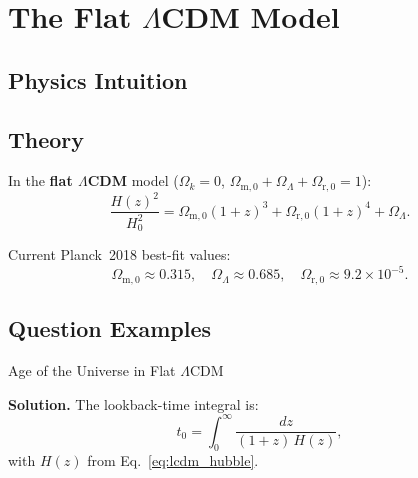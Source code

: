 \documentclass[12pt, a4paper, openright]{report}
\begin{document}
\section{The Flat $\Lambda$CDM Model}

\subsection{Physics Intuition}

\begin{intuition}
\lipsum[21][1-4]   %
\end{intuition}

\subsection{Theory}

\begin{theory}
In the \textbf{flat $\Lambda$CDM} model ($\Omega_k=0$,
$\Omega_\mathrm{m,0}+\Omega_{\Lambda}+\Omega_\mathrm{r,0}=1$):
\begin{equation}
  \frac{H(z)^2}{H_0^2}
    = \Omega_{\mathrm{m},0}(1+z)^3
    + \Omega_{\mathrm{r},0}(1+z)^4
    + \Omega_\Lambda.
  \label{eq:lcdm_hubble}
\end{equation}

Current Planck~2018 best-fit values:
\begin{equation*}
  \Omega_\mathrm{m,0} \approx 0.315, \quad
  \Omega_\Lambda \approx 0.685, \quad
  \Omega_\mathrm{r,0} \approx 9.2 \times 10^{-5}.
\end{equation*}

\lipsum[22][1-5]   %
\end{theory}

\subsection{Question Examples}

\begin{example}{Age of the Universe in Flat $\Lambda$CDM}{}
\lipsum[23][1-2]   %

\medskip\textbf{Solution.}\quad
The lookback-time integral is:
\begin{equation}
  t_0 = \int_0^\infty \frac{dz}{(1+z)\,H(z)},
\end{equation}
with $H(z)$ from Eq.~\eqref{eq:lcdm_hubble}.
\lipsum[23][3-4]   %
\end{example}
\end{document}
